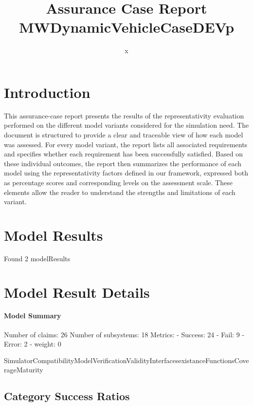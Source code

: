 \documentclass{article}
\title{Assurance Case Report MWDynamicVehicleCaseDEVp}
\author{x}
\begin{document}
	\maketitle
	\section{Introduction}
	This assurance-case report presents the results of the 
	representativity evaluation performed on the different model variants considered for 
	the simulation need. The document is structured to provide a clear and traceable view of how 
	each model was assessed. For every model variant, the report lists all associated requirements
	 and specifies whether each requirement has been successfully satisfied. Based on these 
	individual outcomes, the report then summarizes the performance of each model using the 
	representativity factors defined in our framework, expressed both as percentage scores 
	and corresponding levels on the assessment scale. These elements allow the reader to understand 
	the strengths and limitations of each variant.
	 
	\section{Model Results}
    Found 2 modelResults
		
			\section{Model Result Details} 
			\paragraph{Model Summary}
			Number of claims: 26
			Number of subsystems: 18
			Metrics:
			- Success: 24
			- Fail: 9
			- Error: 2
			- weight: 0
			
			SimulatorCompatibilityModelVerificationValidityInterfacesexistanceFunctionsCoverageMaturity

					\subsection{Category Success Ratios}
						
\end{document}
